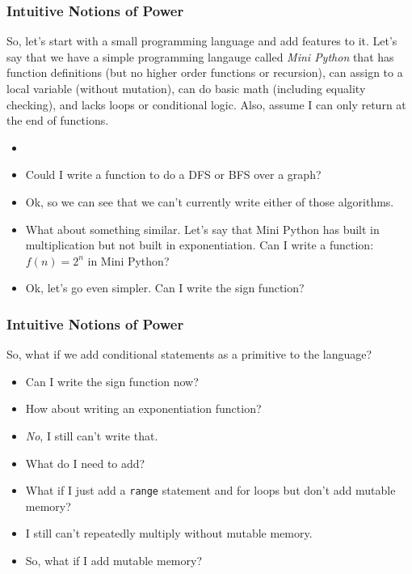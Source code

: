 \documentclass{beamer}
\begin{document}

\begin{frame}
  \frametitle{Intuitive Notions of Power}
  So, let's start with a small programming language and add features to it. Let's say
  that we have a simple programming langauge called \emph{Mini Python} that has function
  definitions (but no higher order functions or recursion), can assign to a local variable (without mutation), can do basic math (including equality checking), and
  lacks loops or conditional logic. Also, assume I can only return at the end of functions.
  \begin{itemize}
  \item<2-> \miniPython
  \item<3-> Could I write a function to do a DFS or BFS over a graph?
  \item<4-> Ok, so we can see that we can't currently write either of those algorithms.
  \item<5-> What about something similar. Let's say that Mini Python has built in multiplication
    but not built in exponentiation. Can I write a function: $f(n) = 2^n$ in Mini Python?
  \item<6-> Ok, let's go even simpler. Can I write the sign function?
  \end{itemize}
\end{frame}

\begin{frame}
  \frametitle{Intuitive Notions of Power}
  So, what if we add conditional statements as a primitive to the language?
  \begin{itemize}
  \item<2-> Can I write the sign function now?
  \item<3-> How about writing an exponentiation function?
  \item<4-> \emph{No}, I still can't write that.
  \item<5-> What do I need to add?
  \item<6-> What if I just add a \texttt{range} statement and
    for loops but don't add mutable memory?
  \item<7-> I still can't repeatedly multiply without mutable memory.
  \item<8-> So, what if I add mutable memory?
  \end{itemize}
\end{frame}
\end{document}
